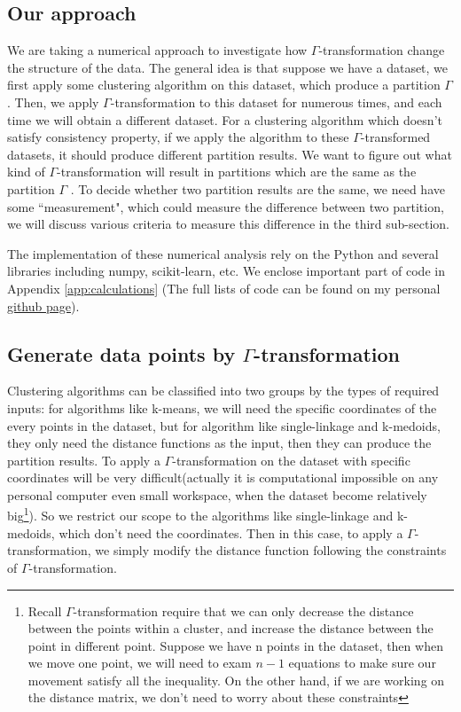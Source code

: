 \documentclass{uonmathreport}
\begin{document}
\subsection{Our approach} \label{subsec:approach}
We are taking a numerical approach to investigate how $\Gamma$-transformation change the structure of the data. The general idea is that suppose we have a dataset, we first apply some clustering algorithm on this dataset, which produce a partition $\Gamma$. Then, we apply $\Gamma$-transformation to this dataset for numerous times, and each time we will obtain a different dataset. For a clustering algorithm which doesn't satisfy consistency property, if we apply the algorithm to these $\Gamma$-transformed datasets, it should produce different partition results. We want to figure out what kind of $\Gamma$-transformation will result in partitions which are the same as the partition $\Gamma$ . To decide whether two partition results are the same, we need have some ``measurement", which could measure the difference between two partition, we will discuss various criteria to measure this difference in the third sub-section.

The implementation of these numerical analysis rely on the Python and several libraries including numpy, scikit-learn, etc. We enclose important part of code in Appendix \ref{app:calculations} (The full lists of code can be found on my personal  \href{https://github.com/Zehui127/clusteringResearch2019}{github page}).

\subsection{Generate data points by $\Gamma$-transformation} \label{subsec:blue}
Clustering algorithms can be classified into two groups by the types of required inputs: for algorithms like k-means, we will need the specific coordinates of the every points in the dataset, but for algorithm like single-linkage and k-medoids, they only need the distance functions as the input, then they can produce the partition results. To apply a $\Gamma$-transformation on the dataset with specific coordinates will be very difficult(actually it is computational impossible on any personal computer even small workspace, when the dataset become relatively big\footnote{Recall $\Gamma$-transformation require that we can only decrease the distance between the points within a cluster, and increase the distance between the point in different point. Suppose we have n points in the dataset, then when we move one point, we will need to exam $n-1$ equations to make sure our movement satisfy all the inequality. On the other hand, if we are working on the distance matrix, we don't need to worry about these constraints}). So we restrict our scope to the algorithms like single-linkage and k-medoids, which don't need the coordinates. Then in this case, to apply a $\Gamma$-transformation, we simply modify the distance function following the constraints of $\Gamma$-transformation.
\end{document}
